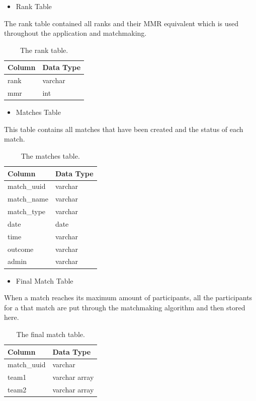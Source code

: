 \newpage
\begin{itemize}
	\item Rank Table
\end{itemize}
The rank table contained all ranks and their MMR equivalent which is used throughout the application and matchmaking.
\begin{table}[h]
	\centering
	\begin{tabular}{ll}
		\toprule
		Column         & Data Type \\
		\midrule
		rank   & varchar   \\
		mmr    & int    \\
		\bottomrule    
	\end{tabular}
	\caption{The rank table.}
\end{table}

\begin{itemize}
	\item Matches Table
\end{itemize}
This table contains all matches that have been created and the status of each match.
\begin{table}[h]
	\centering
	\begin{tabular}{ll}
		\toprule
		Column         & Data Type \\
		\midrule
		match\_uuid & varchar   \\
		match\_name & varchar   \\
		match\_type & varchar   \\
		date        & date      \\
		time        & varchar   \\
		outcome     & varchar   \\
		admin       & varchar   \\
		\bottomrule    
	\end{tabular}
	\caption{The matches table.}
\end{table}

\newpage
\begin{itemize}
	\item Final Match Table
\end{itemize}
When a match reaches its maximum amount of participants, all the participants for a that match are put through the matchmaking algorithm and then stored here. 
\begin{table}[h]
	\centering
	\begin{tabular}{ll}
		\toprule
		Column         & Data Type \\
		\midrule
		match\_uuid & varchar       \\
		team1       & varchar array \\
		team2       & varchar array \\
		\bottomrule    
	\end{tabular}
	\caption{The final match table.}
\end{table}

